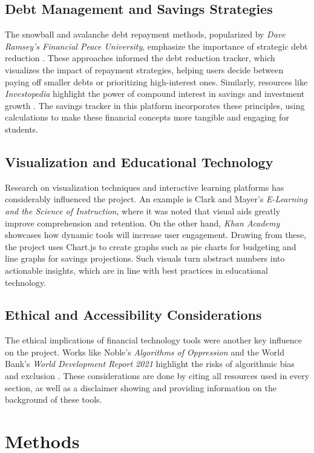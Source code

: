 \documentclass[11pt,twocolumn]{article}
\begin{document}
\subsection{Debt Management and Savings Strategies}
The snowball and avalanche debt repayment methods, popularized by \textit{Dave Ramsey’s Financial Peace University}, emphasize the importance of strategic debt reduction \cite{ramsey}. These approaches informed the debt reduction tracker, which visualizes the impact of repayment strategies, helping users decide between paying off smaller debts or prioritizing high-interest ones. Similarly, resources like \textit{Investopedia} highlight the power of compound interest in savings and investment growth \cite{investopedia}. The savings tracker in this platform incorporates these principles, using  calculations to make these financial concepts more tangible and engaging for students.

\subsection{Visualization and Educational Technology}
Research on visualization techniques and interactive learning platforms has considerably influenced the project. An example is Clark and Mayer's \textit{E-Learning and the Science of Instruction}, where it was noted that visual aids greatly improve comprehension and retention. On the other hand, \textit{Khan Academy} showcases how dynamic tools will increase user engagement. Drawing from these, the project uses Chart.js to create graphs such as pie charts for budgeting and line graphs for savings projections. Such visuals turn abstract numbers into actionable insights, which are in line with best practices in educational technology.

\subsection{Ethical and Accessibility Considerations}
The ethical implications of financial technology tools were another key influence on the project. Works like Noble’s \textit{Algorithms of Oppression} and the World Bank’s \textit{World Development Report 2021} highlight the risks of algorithmic bias and exclusion \cite{noble, worldbank}. These considerations are done by citing all resources used in every section, as well as a disclaimer showing and providing information on the background of these tools. 

\section{Methods}
\end{document}
